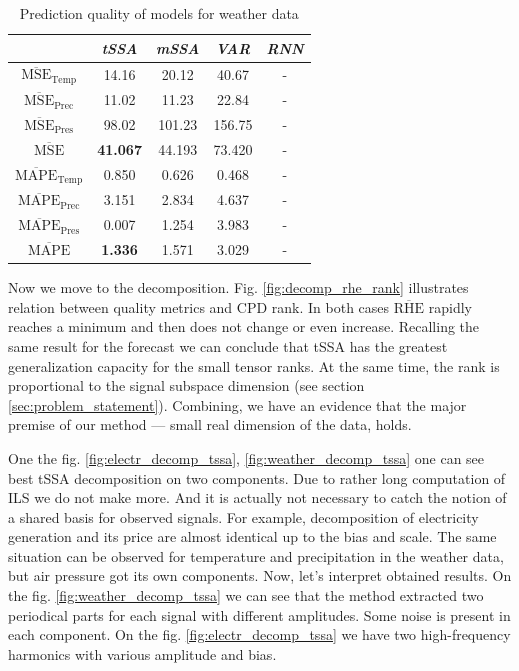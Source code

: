 	\def\arraystretch{1.1}
	\begin{table}[h]
		\centering
		\caption{Prediction quality of models for weather data}\label{tab:pred_res_weather}
		\begin{tabular}{|c|c|c|c|c|}
			\hline
			& \textit{tSSA}                & \textit{mSSA} & \textit{VAR} & \textit{RNN} \\ \hline
			$ \overline{\text{MSE}}_{\text{Temp}} $  & 14.16                        & 20.12         & 40.67        & -            \\ \hline
			$ \overline{\text{MSE}}_{\text{Prec}} $  & 11.02                        & 11.23         & 22.84        & -            \\ \hline
			$ \overline{\text{MSE}}_{\text{Pres}} $  & 98.02                        & 101.23        & 156.75       & -            \\ \hline
			$ \overline{\text{MSE}} $        & \textbf{41.067}              & 44.193        & 73.420       & -            \\ \hline
			$ \overline{\text{MAPE}}_{\text{Temp}} $ & 0.850 & 0.626         & 0.468        & -            \\ \hline
			$ \overline{\text{MAPE}}_{\text{Prec}} $ & 3.151 & 2.834         & 4.637        & -            \\ \hline
			$ \overline{\text{MAPE}}_{\text{Pres}} $ & 0.007 & 1.254         & 3.983        & -            \\ \hline
			$ \overline{\text{MAPE}} $       & \textbf{1.336}               & 1.571         & 3.029        & -            \\ \hline
		\end{tabular}
	\end{table}
	
	Now we move to the decomposition. Fig. \ref{fig:decomp_rhe_rank} illustrates relation between quality metrics and CPD rank. In both cases $ \overline{\text{RHE}} $ rapidly reaches a minimum and then does not change or even increase. Recalling the same result for the forecast we can conclude that tSSA has the greatest generalization capacity for the small tensor ranks. At the same time, the rank is proportional to the signal subspace dimension (see section \ref{sec:problem_statement}). Combining, we have an evidence that the major premise of our method --- small real dimension of the data, holds.
	
	One the fig. \ref{fig:electr_decomp_tssa}, \ref{fig:weather_decomp_tssa} one can see best tSSA decomposition on two components. Due to rather long computation of ILS we do not make more. And it is actually not necessary to catch the notion of a shared basis for observed signals. For example, decomposition of electricity generation and its price are almost identical up to the bias and scale. The same situation can be observed for temperature and precipitation in the weather data, but air pressure got its own components. Now, let's interpret obtained results. On the fig. \ref{fig:weather_decomp_tssa} we can see that the method extracted two periodical parts for each signal with different amplitudes. Some noise is present in each component. On the fig. \ref{fig:electr_decomp_tssa} we have two high-frequency harmonics with various amplitude and bias.	
	
